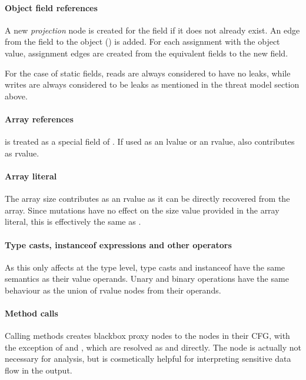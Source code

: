\paragraph{Object field references}
A new \emph{projection} node is created for the field if it does not already exist.
An edge from the field to the object () is added.
For each assignment with the object value,
assignment edges are created from the equivalent fields to the new field.

For the case of static fields,
reads are always considered to have no leaks,
while writes are always considered to be leaks
as mentioned in the threat model section above.

\paragraph{Array references}
 is treated as a special field of .
If used as an lvalue or an rvalue,  also contributes as rvalue.

\paragraph{Array literal}
The array size contributes as an rvalue as it can be directly recovered from the array.
Since mutations have no effect on the size value provided in the array literal,
this is effectively the same as .

\paragraph{Type casts, instanceof expressions and other operators}
As this only affects at the type level,
type casts and instanceof have the same semantics as their value operands.
Unary and binary operations have the same behaviour as
the union of rvalue nodes from their operands.

\paragraph{Method calls}
Calling methods creates blackbox proxy nodes to the nodes in their \ac{CFG},
with the exception of  and ,
which are resolved as  and  directly.
The  node is actually not necessary for analysis,
but is cosmetically helpful for interpreting sensitive data flow in the output.

